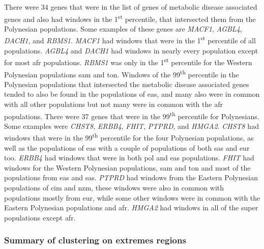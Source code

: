 \documentclass[]{report}
\begin{document}
There were 34 genes that were in the list of genes of metabolic disease
associated genes and also had windows in the 1\textsuperscript{st}
percentile, that intersected them from the Polynesian populations. Some
examples of these genes are \emph{MACF1}, \emph{AGBL4}, \emph{DACH1},
and \emph{RBMS1}. \emph{MACF1} had windows that were in the
1\textsuperscript{st} percentile of all populations. \emph{AGBL4} and
\emph{DACH1} had windows in nearly every population except for most
\gls{afr} populations. \emph{RBMS1} was only in the
1\textsuperscript{st} percentile for the Western Polynesian populations
\gls{sam} and \gls{ton}. Windows of the 99\textsuperscript{th}
percentile in the Polynesian populations that intersected the metabolic
disease associated genes tended to also be found in the populations of
\gls{eas}, and many also were in common with all other populations but
not many were in common with the \gls{afr} populations. There were 37
genes that were in the 99\textsuperscript{th} percentile for
Polynesians. Some examples were \emph{CHST8}, \emph{ERBB4}, \emph{FHIT},
\emph{PTPRD}, and \emph{HMGA2}. \emph{CHST8} had windows that were in
the 99\textsuperscript{th} percentile for the four Polynesian
populations, as well as the populations of \gls{eas} with a couple of
populations of both \gls{sas} and \gls{eur} too. \emph{ERBB4} had
windows that were in both \gls{pol} and \gls{eas} populations.
\emph{FHIT} had windows for the Western Polynesian populations,
\gls{sam} and \gls{ton} and most of the populations from \gls{eas} and
\gls{sas}. \emph{PTPRD} had windows from the Eastern Polynesian
populations of \gls{cim} and \gls{nzm}, these windows were also in
common with populations mostly from \gls{eur}, while some other windows
were in common with the Eastern Polynesian populations and \gls{afr}.
\emph{HMGA2} had windows in all of the super populations except
\gls{afr}.

\subsubsection{Summary of clustering on extremes
regions}\label{summary-of-clustering-on-extremes-regions}
\end{document}
